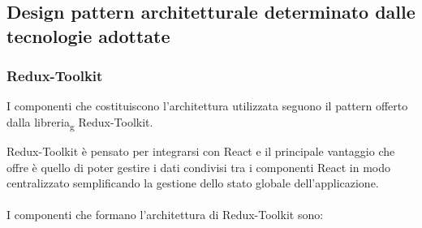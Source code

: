 \subsection{Design pattern architetturale determinato dalle tecnologie adottate}
\label{design Redux}

\subsubsection{Redux-Toolkit}
I componenti che costituiscono l'architettura utilizzata seguono il pattern offerto dalla libreria\textsubscript{g} Redux-Toolkit.

Redux-Toolkit è pensato per integrarsi con React e il principale vantaggio che offre è quello di poter gestire i dati condivisi tra 
i componenti React in modo centralizzato semplificando la gestione dello stato globale dell'applicazione.
\\\\
I componenti che formano l'architettura di Redux-Toolkit sono:

